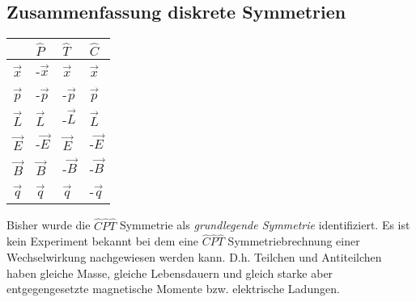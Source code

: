 \subsection{Zusammenfassung diskrete Symmetrien}
\begin{table}[H]
\centering
\begin{tabular}[c]{l|lll}
 & $\hat{P}$ & $\hat{T}$ & $\hat{C}$\\\hline
$\vec{x}$ & -$\vec{x}$ & $\vec{x}$ & $\vec{x}$\\
$\vec{p}$ & -$\vec{p}$ & -$\vec{p}$ & $\vec{p}$\\
$\vec{L}$ & $\vec{L}$ & -$\vec{L}$ & $\vec{L}$\\
$\vec{E}$ & -$\vec{E}$ & $\vec{E}$ & -$\vec{E}$\\
$\vec{B}$ & $\vec{B}$ & -$\vec{B}$ & -$\vec{B}$\\
$\vec{q}$ & $\vec{q}$ & $\vec{q}$ & -$\vec{q}$  
\end{tabular}
\end{table}

Bisher wurde die $\hat{C}\hat{P}\hat{T}$ Symmetrie als \textit{grundlegende
Symmetrie} identifiziert. Es ist kein Experiment bekannt bei dem eine
 $\hat{C}\hat{P}\hat{T}$ Symmetriebrechnung einer Wechselwirkung nachgewiesen
werden kann. D.h. Teilchen und Antiteilchen haben gleiche Masse, gleiche
Lebensdauern und gleich starke aber entgegengesetzte magnetische Momente bzw.
elektrische Ladungen.
